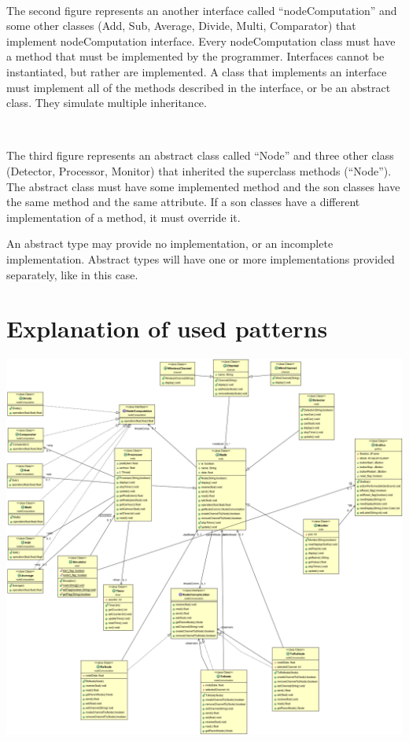 \documentclass[a4paper,titlepage]{article}
\begin{document}
~

The second figure represents an another interface called ``nodeComputation'' and some other classes (Add, Sub, Average, Divide, Multi, Comparator) that implement nodeComputation interface. Every nodeComputation class must have a method that must be implemented by the programmer. Interfaces cannot be instantiated, but rather are implemented. A class that implements an interface must implement all of the methods described in the interface, or be an abstract class. They simulate multiple inheritance.

~

The third figure represents an abstract class called ``Node'' and three other class (Detector, Processor, Monitor) that inherited the superclass methods (``Node''). The abstract class must have some implemented method and the son classes have the same method and the same attribute. If a son classes have a different implementation of a method, it must override it.  

An abstract type may provide no implementation, or an incomplete implementation. Abstract types will have one or more implementations provided separately, like in this case. 

\newpage
\section{Explanation of used patterns}

    \begin{center}

    \centering
    \includegraphics[scale=0.30]{ClassDiagram.png}

    \end{center}
\end{document}
